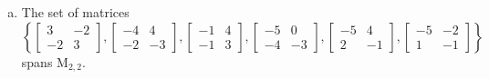 \begin{exerciseAnswer}
\begin{enumerate}[(a)]
\item The set of matrices \( \left\{ \left[\begin{array}{cc}
3 & -2 \\
-2 & 3
\end{array}\right] , \left[\begin{array}{cc}
-4 & 4 \\
-2 & -3
\end{array}\right] , \left[\begin{array}{cc}
-1 & 4 \\
-1 & 3
\end{array}\right] , \left[\begin{array}{cc}
-5 & 0 \\
-4 & -3
\end{array}\right] , \left[\begin{array}{cc}
-5 & 4 \\
2 & -1
\end{array}\right] , \left[\begin{array}{cc}
-5 & -2 \\
1 & -1
\end{array}\right] \right\} \) spans \(\mathrm{M}_{2,2}\). 
\end{enumerate}
    
\end{exerciseAnswer}
    
